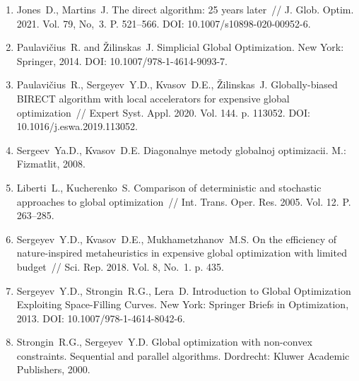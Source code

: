 \documentclass[a4paper,12pt,russian]{article}
\begin{document}
\begin{enumerate}
\item \label{rfa:enlit:Jones2021}
Jones~D., Martins~J. The direct algorithm: 25 years later~// J. Glob. Optim. 2021. Vol. 79, No,~3. P. 521--566. DOI: 10.1007/s10898-020-00952-6.

\item \label{rfa:enlit:PaulaviciusZilinskas2014}
Paulavi{\v c}ius~R. and {\v Z}ilinskas~J. Simplicial Global Optimization. New York: Springer, 2014. DOI: 10.1007/978-1-4614-9093-7.

\item \label{rfa:enlit:Birect2020}
Paulavi{\v c}ius~R., Sergeyev~Y.D., Kvasov~D.E., {\v Z}ilinskas~J. Globally-biased {BIRECT} algorithm with local accelerators for expensive global optimization~// 
Expert Syst. Appl. 2020. Vol. 144. p. 113052. DOI: 10.1016/j.eswa.2019.113052.

\item \label{rfa:enlit:Sergeyev2017}
Sergeev~Ya.D., Kvasov~D.E. Diagonalnye metody globalnoj optimizacii.  M.: Fizmatlit, 2008. 

\item \label{rfa:enlit:Liberti2005}
Liberti~L., Kucherenko~S. Comparison of deterministic and stochastic approaches to global optimization~// Int. Trans. Oper. Res. 2005. Vol. 12. P. 263--285.

\item \label{rfa:enlit:Sergeyev2018}
Sergeyev~Y.D., Kvasov~D.E., Mukhametzhanov~M.S. On the efficiency of nature-inspired metaheuristics in expensive global optimization with limited budget~// Sci. Rep. 2018. Vol. 8, No.~1. p. 435.

\item \label{rfa:enlit:Sergeyev2013}
Sergeyev~Y.D., Strongin~R.G., Lera~D. Introduction to Global Optimization Exploiting Space-Filling Curves. New York: Springer Briefs in Optimization, 2013. DOI: 10.1007/978-1-4614-8042-6.

\item \label{rfa:enlit:Strongin2000}
Strongin~R.G., Sergeyev~Y.D. Global optimization with non-convex constraints. Sequential and parallel algorithms. Dordrecht: Kluwer Academic Publishers, 2000.


\end{enumerate}
\end{document}
